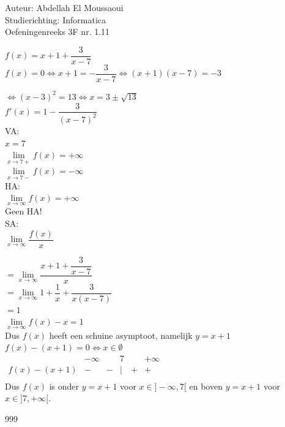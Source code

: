 \documentclass[a4paper]{article}
\begin{document}
  
\noindent \large Auteur: Abdellah El Moussaoui \\
\noindent \large Studierichting: Informatica\\
\noindent \large Oefeningenreeks 3F nr. 1.11\\

\medskip

\normalsize

$f(x)=x+1+\dfrac{3}{x-7}$\\

$f(x)=0 \Leftrightarrow x+1=-\dfrac{3}{x-7}\Leftrightarrow(x+1)(x-7)=-3$

$\Leftrightarrow (x-3)^2=13 \Leftrightarrow x=3\pm\sqrt{13}$\\

$f'(x)=1-\dfrac{3}{(x-7)^2}$\\

VA:\\

$x=7$\\

$\lim\limits_{x\to7+} f(x) = +\infty$\\

$\lim\limits_{x\to7-} f(x) = -\infty$\\

HA:\\

$\lim\limits_{x\to\infty} f(x) = +\infty$\\

Geen HA!\\

SA:\\

$\lim\limits_{x\to\infty} \dfrac{f(x)}{x}$

$= \lim\limits_{x\to\infty} \dfrac{x+1+\dfrac{3}{x-7}}{x}$\\

$=\lim\limits_{x\to\infty} 1 + \dfrac{1}{x} + \dfrac{3}{x(x-7)}$\\

$ = 1$\\

$\lim\limits_{x\to\infty} f(x)-x = 1$\\

Dus $f(x)$ heeft een schuine asymptoot, namelijk $y=x+1$\\

$f(x)-(x+1) = 0 \Leftrightarrow x\in \emptyset$\\

$\begin{array}{r|ccccccc}
           & -\infty &          & 7     &       & +\infty \\
    \hline  
    f(x)-(x+1)  &   -    & - & |& +   &  +   \\
\end{array}$ \\

Dus $f(x)$ is onder $y=x+1$ voor $x \in ]-\infty,7[$ en boven $y=x+1$ voor $x\in ]7,+\infty[ .$\\

\begin{thebibliography}{999}
\end{thebibliography}
\end{document}
